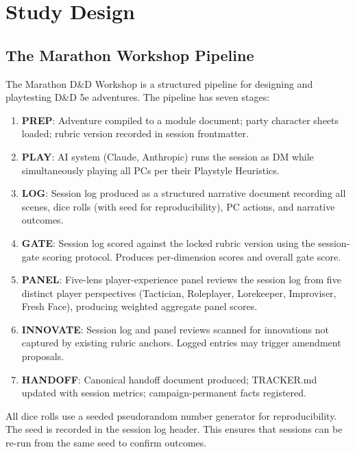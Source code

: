 
\section{Study Design}
\label{sec:study}

\subsection{The Marathon Workshop Pipeline}

The Marathon D\&D Workshop is a structured pipeline for designing and playtesting
D\&D 5e adventures. The pipeline has seven stages:

\begin{enumerate}
  \item \textbf{PREP}: Adventure compiled to a module document; party character sheets
        loaded; rubric version recorded in session frontmatter.
  \item \textbf{PLAY}: AI system (Claude, Anthropic) runs the session as DM while
        simultaneously playing all PCs per their Playstyle Heuristics.
  \item \textbf{LOG}: Session log produced as a structured narrative document recording
        all scenes, dice rolls (with seed for reproducibility), PC actions, and
        narrative outcomes.
  \item \textbf{GATE}: Session log scored against the locked rubric version using the
        session-gate scoring protocol. Produces per-dimension scores and overall gate score.
  \item \textbf{PANEL}: Five-lens player-experience panel reviews the session log from
        five distinct player perspectives (Tactician, Roleplayer, Lorekeeper, Improviser,
        Fresh Face), producing weighted aggregate panel scores.
  \item \textbf{INNOVATE}: Session log and panel reviews scanned for innovations not
        captured by existing rubric anchors. Logged entries may trigger amendment proposals.
  \item \textbf{HANDOFF}: Canonical handoff document produced; TRACKER.md updated with
        session metrics; campaign-permanent facts registered.
\end{enumerate}

All dice rolls use a seeded pseudorandom number generator for reproducibility.
The seed is recorded in the session log header. This ensures that sessions can be
re-run from the same seed to confirm outcomes.

